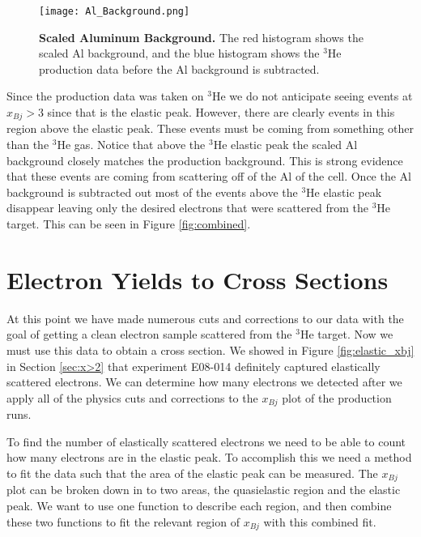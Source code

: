\begin{figure}[!ht]
\begin{center}
\texttt{[image: Al\_Background.png]}
\end{center}
\caption[Scaled Aluminum Background]{
{\bf{Scaled Aluminum Background.}} The red histogram shows the scaled Al background, and the blue histogram shows the $^3$He production data before the Al background is subtracted.}
\label{fig:al}
\end{figure}

Since the production data was taken on $^3$He we do not anticipate seeing events at $x_{Bj} > 3$ since that is the elastic peak. However, there are clearly events in this region above the elastic peak. These events must be coming from something other than the $^3$He gas. Notice that above the $^3$He elastic peak the scaled Al background closely matches the production background. This is strong evidence that these events are coming from scattering off of the Al of the cell. Once the Al background is subtracted out most of the events above the $^3$He elastic peak disappear leaving only the desired electrons that were scattered from the $^3$He target. This can be seen in Figure \ref{fig:combined}.

\section{Electron Yields to Cross Sections}
\label{sec:yield}

At this point we have made numerous cuts and corrections to our data with the goal of getting a clean electron sample scattered from the $^3$He target. Now we must use this data to obtain a cross section. We showed in Figure \ref{fig:elastic_xbj} in Section \ref{sec:x>2} that experiment E08-014 definitely captured elastically scattered electrons. We can determine how many electrons we detected after we apply all of the physics cuts and corrections to the $x_{Bj}$ plot of the production runs.

To find the number of elastically scattered electrons we need to be able to count how many electrons are in the elastic peak. To accomplish this we need a method to fit the data such that the area of the elastic peak can be measured. The $x_{Bj}$ plot can be broken down in to two areas, the quasielastic region and the elastic peak. We want to use one function to describe each region, and then combine these two functions to fit the relevant region of $x_{Bj}$ with this combined fit. 

